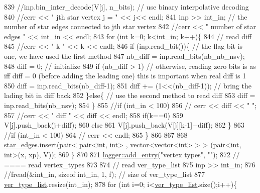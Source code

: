 \begin{DoxyCode}
839       \textcolor{comment}{//inp.bin\_inter\_decode(V[j], n\_bits); // use binary interpolative decoding}
840       \textcolor{comment}{//cerr << "  jth star vertex j = " << j<< endl; }
841       inp >> int\_in; \textcolor{comment}{// the number of star edges connected to jth star vertex}
842       \textcolor{comment}{//cerr << " number of star edges " << int\_in << endl;}
843       \textcolor{keywordflow}{for} (\textcolor{keywordtype}{int} k=0; k<int\_in; k++)\{
844         \textcolor{comment}{// read diff}
845         \textcolor{comment}{//cerr << " k " << k << endl;}
846         \textcolor{keywordflow}{if} (inp.read\_bit())\{ \textcolor{comment}{// the flag bit is one, we have used the first method }
847           nb\_diff = inp.read\_bits(nb\_nb\_nsv);
848           diff = 0; \textcolor{comment}{// initialize}
849           \textcolor{keywordflow}{if} (nb\_diff > 1) \textcolor{comment}{// otherwise, reading zero bits is as iff diff = 0 (before adding the leading
       one) this is important when real diff is 1}
850             diff = inp.read\_bits(nb\_diff-1);
851           diff += (1<<(nb\_diff-1)); \textcolor{comment}{// bring the lading bit in diff back }
852         \}\textcolor{keywordflow}{else}\{ \textcolor{comment}{// use the second method to read diff}
853           diff = inp.read\_bits(nb\_nsv);
854         \}
855         \textcolor{comment}{//if (int\_in < 100)}
856         \textcolor{comment}{//  cerr << diff << " ";}
857         \textcolor{comment}{//cerr << " diff " << diff << endl;}
858         \textcolor{keywordflow}{if}(k==0)
859           V[j].push\_back(j+diff);
860         \textcolor{keywordflow}{else}
861           V[j].push\_back(V[j][k-1]+diff);
862       \}
863       \textcolor{comment}{//if (int\_in < 100)}
864       \textcolor{comment}{//  cerr << endl;}
865     \}
866 
867 
868     \hyperlink{classmarked__graph__compressed_a7df5779d313486644132bd816937f532}{star\_edges}.insert(pair< pair<int, int> , vector<vector<int> > > (pair<int, int>(x, xp), V));
869   \}
870 
871   \hyperlink{classlogger_a710163deb17bc81f70d53d285b8ac9ac}{logger::add\_entry}(\textcolor{stringliteral}{"vertex types"}, \textcolor{stringliteral}{""});
872   \textcolor{comment}{// ==== read vertex\_types}
873 
874   \textcolor{comment}{// read ver\_type\_list}
875   inp >> int\_in;
876   \textcolor{comment}{//fread(&int\_in, sizeof int\_in, 1, f); // size of ver\_type\_list}
877   \hyperlink{classmarked__graph__compressed_af2e3e55223d436628a02758dfae88493}{ver\_type\_list}.resize(int\_in);
878   \textcolor{keywordflow}{for} (\textcolor{keywordtype}{int} i=0; i<\hyperlink{classmarked__graph__compressed_af2e3e55223d436628a02758dfae88493}{ver\_type\_list}.size();i++)\{

\end{DoxyCode}
